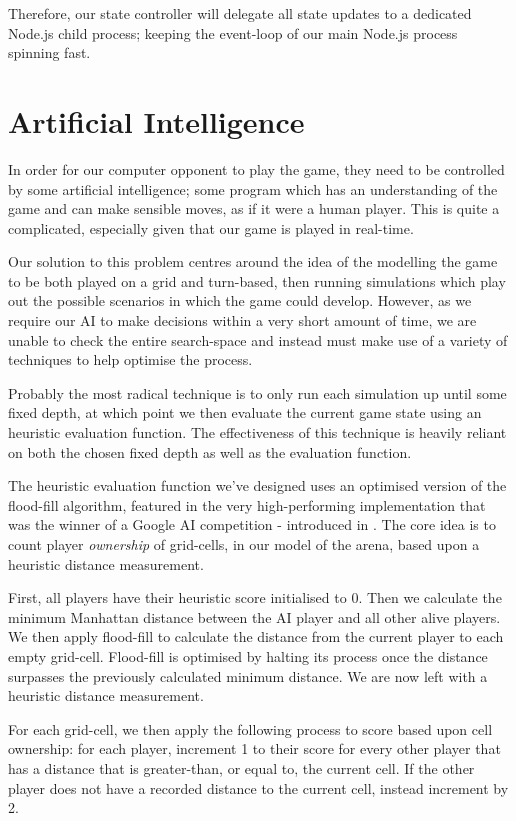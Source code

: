 \documentclass{standalone}
\begin{document}
			Therefore, our state controller will delegate all state updates to a dedicated Node.js child process; keeping the event-loop of our main Node.js process spinning fast.

	\section{Artificial Intelligence} \label{sec:design-ai}
		In order for our computer opponent to play the game, they need to be controlled by some artificial intelligence; some program which has an understanding of the game and can make sensible moves, as if it were a human player. This is quite a complicated, especially given that our game is played in real-time.

		Our solution to this problem centres around the idea of the modelling the game to be both played on a grid and turn-based, then running simulations which play out the possible scenarios in which the game could develop. However, as we require our AI to make decisions within a very short amount of time, we are unable to check the entire search-space and instead must make use of a variety of techniques to help optimise the process.

		Probably the most radical technique is to only run each simulation up until some fixed depth, at which point we then evaluate the current game state using an heuristic evaluation function. The effectiveness of this technique is heavily reliant on both the chosen fixed depth as well as the evaluation function.

		The heuristic evaluation function we've designed uses an optimised version of the flood-fill algorithm, featured in the very high-performing implementation that was the winner of a Google AI competition - introduced in . The core idea is to count player \emph{ownership} of grid-cells, in our model of the arena, based upon a heuristic distance measurement.

		First, all players have their heuristic score initialised to 0. Then we calculate the minimum Manhattan distance between the AI player and all other alive players. We then apply flood-fill to calculate the distance from the current player to each empty grid-cell. Flood-fill is optimised by halting its process once the distance surpasses the previously calculated minimum distance. We are now left with a heuristic distance measurement.

		For each grid-cell, we then apply the following process to score based upon cell ownership: for each player, increment 1 to their score for every other player that has a distance that is greater-than, or equal to, the current cell. If the other player does not have a recorded distance to the current cell, instead increment by 2.
\end{document}
